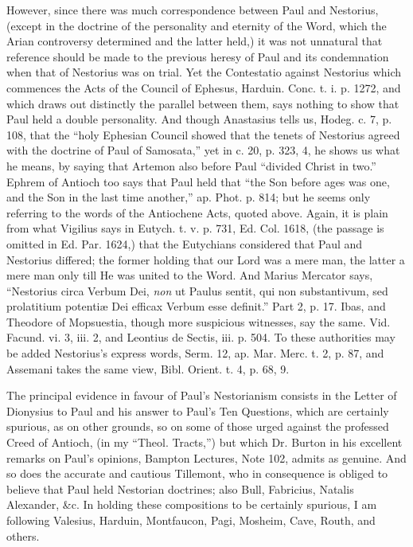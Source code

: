 However,
since there was much correspondence between Paul and Nestorius,
(except in the doctrine of the personality and eternity of the Word,
which the Arian controversy determined and the latter held,) it was
not unnatural that reference should be made to the previous heresy of
Paul and its condemnation when that of Nestorius was on trial. Yet the
Contestatio against Nestorius which commences the Acts of the Council
of Ephesus, Harduin. Conc. t. i. p. 1272, and which draws out
distinctly the parallel between them, says nothing to show that Paul
held a double personality. And though Anastasius tells us, Hodeg. c.
7, p. 108, that the ``holy Ephesian Council showed that the tenets of
Nestorius agreed with the doctrine of Paul of Samosata,'' yet in c. 20,
p. 323, 4, he shows us what he means, by saying that Artemon also
before Paul ``divided Christ in two.'' Ephrem of Antioch too says that
Paul held that ``the Son before ages was one, and the Son in the last
time another,'' ap. Phot. p. 814; but he seems only referring to the
words of the Antiochene Acts, quoted above. Again, it is plain from
what Vigilius says in Eutych. t. v. p. 731, Ed. Col. 1618, (the
passage is omitted in Ed. Par. 1624,) that the Eutychians considered
that Paul and Nestorius differed; the former holding that our Lord
was a mere man, the latter a mere man only till He was united to
the Word. And Marius Mercator says, ``Nestorius circa Verbum Dei, \emph{non}
ut Paulus sentit, qui non substantivum, sed prolatitium potentiæ Dei
efficax Verbum esse definit.'' Part 2, p. 17. Ibas, and Theodore of
Mopsuestia, though more suspicious witnesses, say the same. Vid.
Facund. vi. 3, iii. 2, and Leontius de Sectis, iii. p. 504. To these
authorities may be added Nestorius's express words, Serm. 12, ap. Mar.
Merc. t. 2, p. 87, and Assemani takes the same view, Bibl. Orient. t.
4, p. 68, 9.

The
principal evidence in favour of Paul's Nestorianism consists in the
Letter of Dionysius to Paul and his answer to Paul's Ten Questions,
which are certainly spurious, as on other grounds, so on some of those
urged against the professed Creed of Antioch, (in my ``Theol. Tracts,'')
but which Dr. Burton in his excellent remarks on Paul's opinions,
Bampton Lectures, Note 102, admits as genuine. And so does the
accurate and cautious Tillemont, who in consequence is obliged to
believe that Paul held Nestorian doctrines; also Bull, Fabricius,
Natalis Alexander, \&c. In holding these compositions to be
certainly spurious, I am following Valesius, Harduin, Montfaucon, Pagi,
Mosheim, Cave, Routh, and others.

